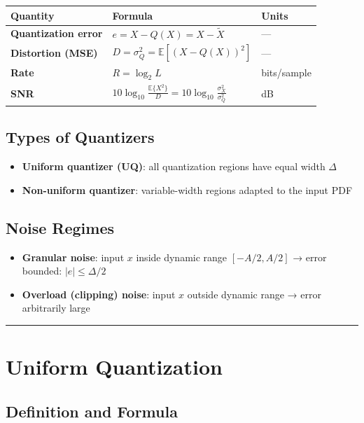 \begin{center}
\begin{tabular}{|l|l|l|}
\hline
\textbf{Quantity} & \textbf{Formula} & \textbf{Units} \\ \hline
\textbf{Quantization error} & $e = X - Q(X) = X - \tilde{X}$ & — \\ \hline
\textbf{Distortion (MSE)} & $D = \sigma_Q^2 = \mathbb{E}[(X - Q(X))^2]$ & — \\ \hline
\textbf{Rate} & $R = \log_2 L$ & bits/sample \\ \hline
\textbf{SNR} & $10\log_{10}\frac{\mathbb{E}\{X^2\}}{D} = 10\log_{10}\frac{\sigma_X^2}{\sigma_Q^2}$ & dB \\ \hline
\end{tabular}
\end{center}

\subsection{Types of Quantizers}

\begin{itemize}
\item \textbf{Uniform quantizer (UQ)}: all quantization regions have equal width $\Delta$
\item \textbf{Non-uniform quantizer}: variable-width regions adapted to the input PDF
\end{itemize}

\subsection{Noise Regimes}

\begin{itemize}
\item \textbf{Granular noise}: input $x$ inside dynamic range $[-A/2, A/2]$ → error bounded: $|e| \leq \Delta/2$
\item \textbf{Overload (clipping) noise}: input $x$ outside dynamic range → error arbitrarily large
\end{itemize}

\bigskip\hrule\bigskip

\section{Uniform Quantization}

\subsection{Definition and Formula}

